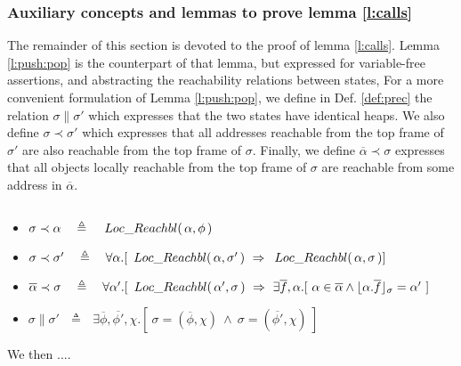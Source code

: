 \subsubsection{Auxiliary concepts and lemmas to prove  lemma  \ref{l:calls}}
The remainder of this section is devoted to the proof of lemma  \ref{l:calls}.
%
Lemma \ref{l:push:pop} is  the counterpart of that lemma, but expressed for  variable-free assertions,
and abstracting the reachability relations between states,
 For a more convenient formulation of Lemma \ref{l:push:pop}, we define in Def. \ref{def:prec} the relation  $\sigma \parallel \sigma' $ which expresses that the two states have identical heaps. 
 We also define 
 $\sigma \prec \sigma'$ which expresses that all addresses reachable from the top frame of $\sigma'$ are also reachable from the top frame of $\sigma$. 
Finally, we define  $\overline \alpha \prec \sigma$ expresses that all objects locally reachable from the top frame of $\sigma$ are reachable from some address in $\overline \alpha$.
 
 
 
\begin{definition}
$~ $ %
\label{def:prec}
\begin{itemize}
\item
$\sigma \prec \alpha\ \ \ \triangleq\ \ \ \LRelevant {\alpha} {\phi}$
\item
$\sigma \prec \sigma'\ \ \ \triangleq\ \ \  \forall \alpha.[\ \LRelevant {\alpha} {\sigma'} \ \Rightarrow \  \LRelevant {\alpha} {\sigma}] $
\item
$\overline \alpha \prec \sigma \ \ \ \triangleq\ \ \  \forall \alpha'.[\ \LRelevant {\alpha'} {\sigma} \ \Rightarrow \  \exists \overline f, \alpha. [\ \alpha \in \overline \alpha \wedge 
\interpret \sigma {\alpha.{\overline f}} = \alpha' \ ]$
\item
$\sigma \parallel \sigma'  \ \ \ \triangleq\ \ \ \exists \overline \phi,  \overline {\phi'}, \chi. [\ \sigma=( \overline \phi, \chi )\ \wedge\ 
\sigma=( \overline {\phi'}, \chi )\ ]$
\end{itemize}
\end{definition}

We then ....

